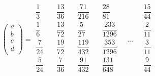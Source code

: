 \begin{itemize}
                $$
                \begin{pmatrix}
                    a \\[12pt]
                    b \\[12pt]
                    c \\[12pt]
                    d \\
                \end{pmatrix}
                =
                \begin{matrix}
                    \dfrac{1}{3} \\[12pt]
                    \dfrac{1}{6} \\[12pt]
                    \dfrac{7}{24}\\[12pt]
                    \dfrac{5}{24}\\
                \end{matrix}
                \quad
                \begin{matrix}
                    \dfrac{13}{36} \\[12pt]
                    \dfrac{13}{72} \\[12pt]
                    \dfrac{19}{72}\\[12pt]
                    \dfrac{7}{36} \\
                \end{matrix}
                \quad
                \begin{matrix}
                    \dfrac{71}{216} \\[12pt]
                    \dfrac{5}{27} \\[12pt]
                    \dfrac{119}{432}\\[12pt]
                    \dfrac{91}{432} \\
                \end{matrix}
                \quad
                \begin{matrix}
                    \dfrac{28}{81} \\[12pt]
                    \dfrac{233}{1296} \\[12pt]
                    \dfrac{353}{1296}\\[12pt]
                    \dfrac{131}{648} \\
                \end{matrix}
                \quad
                \ldots
                \quad
                \begin{matrix}
                    \dfrac{15}{44} \\[12pt]
                    \dfrac{2}{11} \\[12pt]
                    \dfrac{3}{11}\\[12pt]
                    \dfrac{9}{44} \\
                \end{matrix}
                $$ 
            \end{itemize}
